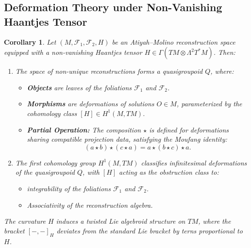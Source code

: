 \documentclass[runningheads]{llncs}
\newtheorem{cor}{Corollary}
\begin{document}
\subsection{Deformation Theory under Non-Vanishing Haantjes Tensor}
\begin{cor}
Let \( (M, \mathcal{F}_1, \mathcal{F}_2, H) \) be an Atiyah--Molino reconstruction space equipped with a non-vanishing Haantjes tensor \( H \in \Gamma(TM \otimes \Lambda^2 T^*M) \). Then:
\begin{enumerate}
\item The space of non-unique reconstructions forms a quasigroupoid \( Q \), where:

\begin{itemize}
    \item \textbf{Objects} are leaves of the foliations \( \mathcal{F}_1 \) and \( \mathcal{F}_2 \).
    \item \textbf{Morphisms} are deformations of solutions \( O \in M \), parameterized by the cohomology class \( [H] \in H^1(M, TM) \).
    \item \textbf{Partial Operation:} The composition \( \star \) is defined for deformations sharing compatible projection data, satisfying the Moufang identity:
    \[
    (a \star b) \star (c \star a) = a \star (b \star c) \star a.
    \]
\end{itemize}

\item The first cohomology group \( H^1(M, TM) \) classifies infinitesimal deformations of the quasigroupoid \( Q \), with \( [H] \) acting as the obstruction class to:

\begin{itemize}
    \item integrability of the foliations \( \mathcal{F}_1 \) and \( \mathcal{F}_2 \).
    \item Associativity of the reconstruction algebra.
\end{itemize}
\end{enumerate}
The curvature $H$ induces a twisted Lie algebroid structure on $TM$, where the bracket $[-,-]_H$ deviates from the standard Lie bracket by terns proportional to $H$.
\end{cor}
\end{document}
